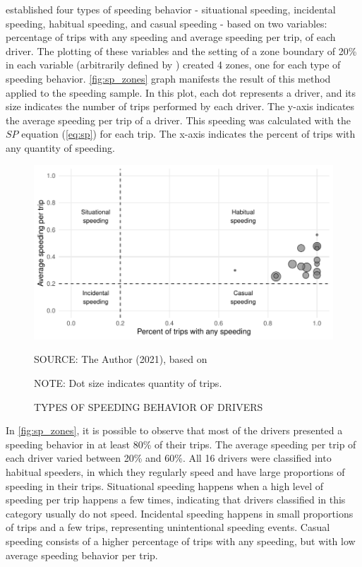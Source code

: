 
\textcite{Richard2013a} established four types of speeding behavior - situational speeding, incidental speeding, habitual speeding, and casual speeding - based on two variables: percentage of trips with any speeding and average speeding per trip, of each driver. The plotting of these variables and the setting of a zone boundary of 20\% in each variable (arbitrarily defined by \textcite{Richard2013a}) created 4 zones, one for each type of speeding behavior. \autoref{fig:sp_zones} graph manifests the result of this method applied to the speeding sample. In this plot, each dot represents a driver, and its size indicates the number of trips performed by each driver. The y-axis indicates the average speeding per trip of a driver. This speeding was calculated with the $SP$ equation (\ref{eq:sp}) for each trip. The x-axis indicates the percent of trips with any quantity of speeding.

\begin{figure}[!htbp]
    \centering\footnotesize
    \captionsetup{font=footnotesize}
    \caption{TYPES OF SPEEDING BEHAVIOR OF DRIVERS}
    \includegraphics{fig/sp_zones.pdf}
    \label{fig:sp_zones}
    \par SOURCE: The Author (2021), based on \textcite{Richard2013a}
    \par NOTE: Dot size indicates quantity of trips.
\end{figure}

In \autoref{fig:sp_zones}, it is possible to observe that most of the drivers presented a speeding behavior in at least 80\% of their trips. The average speeding per trip of each driver varied between 20\% and 60\%. All 16 drivers were classified into habitual speeders, in which they regularly speed and have large proportions of speeding in their trips. Situational speeding happens when a high level of speeding per trip happens a few times, indicating that drivers classified in this category usually do not speed. Incidental speeding happens in small proportions of trips and a few trips, representing unintentional speeding events. Casual speeding consists of a higher percentage of trips with any speeding, but with low average speeding behavior per trip.   

